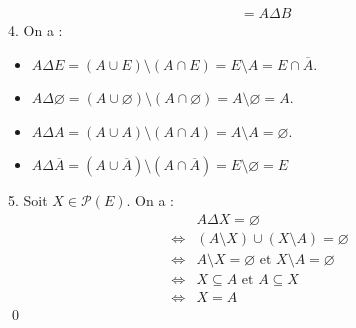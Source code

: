 \documentclass[10pt]{article}
\begin{document}
\begin{tcolorbox}[enhanced, width=7in, center, size=fbox, fontupper=\large, drop shadow southwest]
\begin{align*}
        &=A \Delta B
    \end{align*}
    4. On a :
    \begin{itemize}
        \item $A \Delta E = (A \cup E) \setminus (A \cap E) = E \setminus A = E \cap \overline{A}$.
        \item $A \Delta \varnothing = (A \cup \varnothing) \setminus (A \cap \varnothing) = A \setminus \varnothing = A$.
        \item $A \Delta A = (A \cup A) \setminus (A \cap A) = A \setminus A = \varnothing$.
        \item $A \Delta \overline{A} = (A \cup \overline{A}) \setminus (A \cap \overline{A}) = E \setminus \varnothing = E$
    \end{itemize}
    5. Soit $X \in \mathcal{P}(E)$. On a :
    \begin{align*}
        &A \Delta X = \varnothing\\
        \iff& (A \setminus X) \cup (X \setminus A) = \varnothing\\
        \iff& A \setminus X = \varnothing \text{ et } X \setminus A = \varnothing\\
        \iff& X \subseteq A \text{ et } A \subseteq X\\
        \iff& X = A
    \end{align*}
    \qed
\end{tcolorbox}

\end{document}
